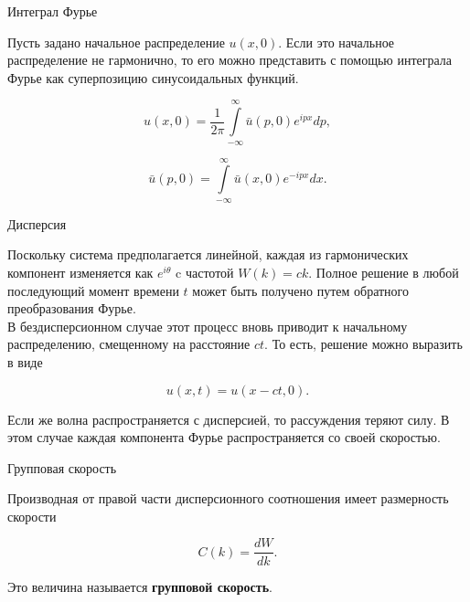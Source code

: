 \documentclass[10pt,xcolor=pst,aspectratio=169]{beamer}
\begin{document}
\begin{frame}{Интеграл Фурье}

	\transdissolve[duration=0.1]
	\justifying
	\large

	Пусть задано начальное распределение $u \left( x, 0 \right)$. Если это начальное распределение не гармонично, то его можно представить с помощью интеграла Фурье как суперпозицию синусоидальных функций.

    \[
        u \left( x, 0 \right) = \frac{1}{2 \pi} \int\limits_{-\infty}^{\infty} \bar{u} \left( p, 0 \right) e^{i p x} dp ,
    \]

    \[
        \bar{u} \left( p, 0 \right) = \int\limits_{-\infty}^{\infty} \bar{u} \left( x, 0 \right) e^{- i p x} dx .
    \]

\end{frame}

\begin{frame}{Дисперсия}

	\transdissolve[duration=0.1]
	\justifying
	\large

    Поскольку система предполагается линейной, каждая из гармонических компонент изменяется как $e^{i \theta}$ c частотой $W \left( k \right) = c k$. Полное решение в любой последующий момент времени $t$ может быть получено путем обратного преобразования Фурье.\\

    В бездисперсионном случае этот процесс вновь приводит к начальному распределению, смещенному на расстояние $c t$. То есть, решение можно выразить в виде

    \[
        u \left( x, t \right) = u \left( x - c t, 0 \right).
    \]

Если же волна распространяется с дисперсией, то рассуждения теряют силу. В этом случае каждая компонента Фурье распространяется со своей скоростью.

\end{frame}

\begin{frame}{Групповая скорость}

	\transdissolve[duration=0.1]
	\justifying
	\large

    Производная от правой части дисперсионного соотношения имеет размерность скорости

    \[
        C \left( k \right) = \frac{d W}{d k}.
    \]

    Это величина называется \textbf{групповой скорость}.

\end{frame}
\end{document}
